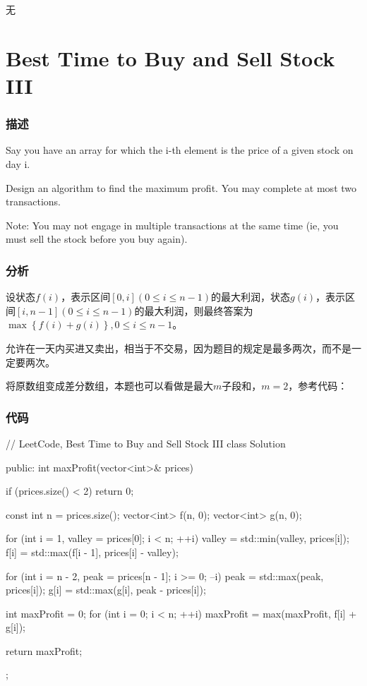 \begindot
\item 无
\myenddot


\section{Best Time to Buy and Sell Stock III} %
\label{sec:best-time-to-buy-and-sell-stock-iii}


\subsubsection{描述}
Say you have an array for which the i-th element is the price of a given stock on day i.

Design an algorithm to find the maximum profit. You may complete at most two transactions.

Note: You may not engage in multiple transactions at the same time (ie, you must sell the stock before you buy again).


\subsubsection{分析}
设状态$f(i)$，表示区间$[0,i](0 \leq i \leq n-1)$的最大利润，状态$g(i)$，表示区间$[i, n-1](0 \leq i \leq n-1)$的最大利润，则最终答案为$\max\left\{f(i)+g(i)\right\},0 \leq i \leq n-1$。

允许在一天内买进又卖出，相当于不交易，因为题目的规定是最多两次，而不是一定要两次。

将原数组变成差分数组，本题也可以看做是最大$m$子段和，$m=2$，参考代码：

\subsubsection{代码}
\begin{Code}
// LeetCode, Best Time to Buy and Sell Stock III
class Solution {
public:
    int maxProfit(vector<int>& prices) {
        if (prices.size() < 2) return 0;

        const int n = prices.size();
        vector<int> f(n, 0);
        vector<int> g(n, 0);

        for (int i = 1, valley = prices[0]; i < n; ++i) {
            valley = std::min(valley, prices[i]);
            f[i] = std::max(f[i - 1], prices[i] - valley);
        }

        for (int i = n - 2, peak = prices[n - 1]; i >= 0; --i) {
            peak = std::max(peak, prices[i]);
            g[i] = std::max(g[i], peak - prices[i]);
        }

        int maxProfit = 0;
        for (int i = 0; i < n; ++i)
            maxProfit = max(maxProfit, f[i] + g[i]);

        return maxProfit;
    }
};
\end{Code}


